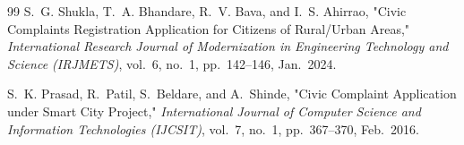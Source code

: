 \documentclass[12pt,a4paper]{report}
\begin{document}
\begin{thebibliography}{99}
S.~G. Shukla, T.~A. Bhandare, R.~V. Bava, and I.~S. Ahirrao, "Civic Complaints Registration Application for Citizens of Rural/Urban Areas," \textit{International Research Journal of Modernization in Engineering Technology and Science (IRJMETS)}, vol.~6, no.~1, pp.~142--146, Jan.~2024.

S.~K. Prasad, R.~Patil, S.~Beldare, and A.~Shinde, "Civic Complaint Application under Smart City Project," \textit{International Journal of Computer Science and Information Technologies (IJCSIT)}, vol.~7, no.~1, pp.~367--370, Feb.~2016.

\end{thebibliography}
\end{document}

